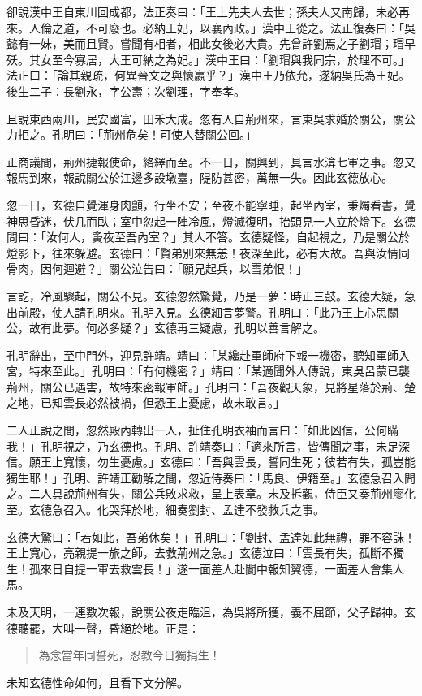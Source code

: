 卻說漢中王自東川回成都，法正奏曰：「王上先夫人去世；孫夫人又南歸，未必再來。人倫之道，不可廢也。必納王妃，以襄內政。」漢中王從之。法正復奏曰：「吳懿有一妹，美而且賢。嘗聞有相者，相此女後必大貴。先曾許劉焉之子劉瑁；瑁早殀。其女至今寡居，大王可納之為妃。」漢中王曰：「劉瑁與我同宗，於理不可。」法正曰：「論其親疏，何異晉文之與懷嬴乎？」漢中王乃依允，遂納吳氏為王妃。後生二子：長劉永，字公壽；次劉理，字奉孝。

且說東西兩川，民安國富，田禾大成。忽有人自荊州來，言東吳求婚於關公，關公力拒之。孔明曰：「荊州危矣！可使人替關公回。」

正商議間，荊州捷報使命，絡繹而至。不一日，關興到，具言水渰七軍之事。忽又報馬到來，報說關公於江邊多設墩臺，隄防甚密，萬無一失。因此玄德放心。

忽一日，玄德自覺渾身肉顫，行坐不安；至夜不能寧睡，起坐內室，秉燭看書，覺神思昏迷，伏几而臥；室中忽起一陣冷風，燈滅復明，抬頭見一人立於燈下。玄德問曰：「汝何人，夤夜至吾內室？」其人不答。玄德疑怪，自起視之，乃是關公於燈影下，往來躲避。玄德曰：「賢弟別來無恙！夜深至此，必有大故。吾與汝情同骨肉，因何迴避？」關公泣告曰：「願兄起兵，以雪弟恨！」

言訖，冷風驟起，關公不見。玄德忽然驚覺，乃是一夢：時正三鼓。玄德大疑，急出前殿，使人請孔明來。孔明入見。玄德細言夢警。孔明曰：「此乃王上心思關公，故有此夢。何必多疑？」玄德再三疑慮，孔明以善言解之。

孔明辭出，至中門外，迎見許靖。靖曰：「某纔赴軍師府下報一機密，聽知軍師入宮，特來至此。」孔明曰：「有何機密？」靖曰：「某適聞外人傳說，東吳呂蒙已襲荊州，關公已遇害，故特來密報軍師。」孔明曰：「吾夜觀天象，見將星落於荊、楚之地，已知雲長必然被禍，但恐王上憂慮，故未敢言。」

二人正說之間，忽然殿內轉出一人，扯住孔明衣袖而言曰：「如此凶信，公何瞞我！」孔明視之，乃玄德也。孔明、許靖奏曰：「適來所言，皆傳聞之事，未足深信。願王上寬懷，勿生憂慮。」玄德曰：「吾與雲長，誓同生死；彼若有失，孤豈能獨生耶！」孔明、許靖正勸解之間，忽近侍奏曰：「馬良、伊籍至。」玄德急召入問之。二人具說荊州有失，關公兵敗求救，呈上表章。未及拆觀，侍臣又奏荊州廖化至。玄德急召入。化哭拜於地，細奏劉封、孟達不發救兵之事。

玄德大驚曰：「若如此，吾弟休矣！」孔明曰：「劉封、孟達如此無禮，罪不容誅！王上寬心，亮親提一旅之師，去救荊州之急。」玄德泣曰：「雲長有失，孤斷不獨生！孤來日自提一軍去救雲長！」遂一面差人赴閬中報知翼德，一面差人會集人馬。

未及天明，一連數次報，說關公夜走臨沮，為吳將所獲，義不屈節，父子歸神。玄德聽罷，大叫一聲，昏絕於地。正是：

\begin{quote}
為念當年同誓死，忍教今日獨捐生！
\end{quote}

未知玄德性命如何，且看下文分解。
